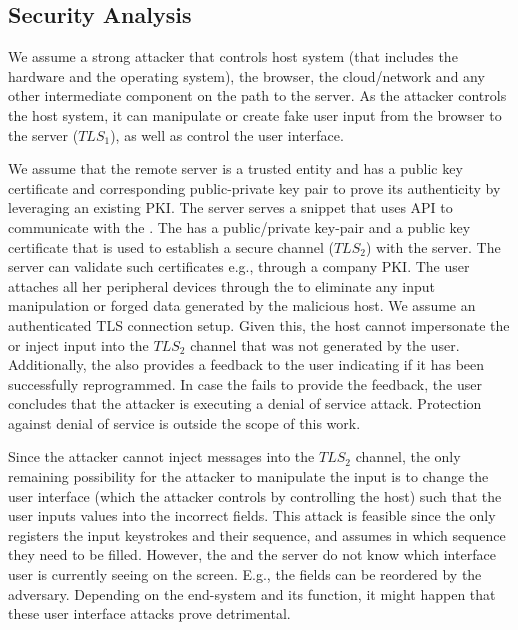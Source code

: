 \iffalse
\subsection{Security Analysis} 
\label{sec:systemDesign:security_analysis}

We assume a strong attacker that controls host system (that includes the hardware and the operating system), the browser, the cloud/network and any other intermediate component on the path to the server. As the attacker controls the host system, it can manipulate or create fake user input from the browser to the server ($TLS_1$), as well as control the user interface.

We assume that the remote server is a trusted entity and has a public key certificate and corresponding public-private key pair to prove its authenticity by leveraging an existing PKI. The server serves a \js snippet that uses \webusb API to communicate with the \device. The \device has a public/private key-pair and a public key certificate that is used to establish a secure channel ($TLS_2$) with the server. The server can validate such certificates e.g., through a company PKI. The user attaches all her peripheral devices through the \device to eliminate any input manipulation or forged data generated by the malicious host. We assume an authenticated TLS connection setup. Given this, the host cannot impersonate the \device or inject input into the $TLS_2$ channel that was not generated by the user. 
Additionally, the \device also provides a feedback to the user indicating if it has been successfully reprogrammed. In case the \device fails to provide the feedback, the user concludes that the attacker is executing a denial of service attack. Protection against denial of service is outside the scope of this work.

Since the attacker cannot inject messages into the $TLS_2$ channel, the only remaining possibility for the attacker to manipulate the input is to change the user interface (which the attacker controls by controlling the host) such that the user inputs values into the incorrect fields. 
This attack is feasible since the \device only registers the input keystrokes and their sequence, and assumes in which sequence they need to be filled. However, the \device and the server do not know which interface user is currently seeing on the screen. E.g., the fields can be reordered by the adversary. Depending on the end-system and its function, it might happen that these user interface attacks prove detrimental. 

